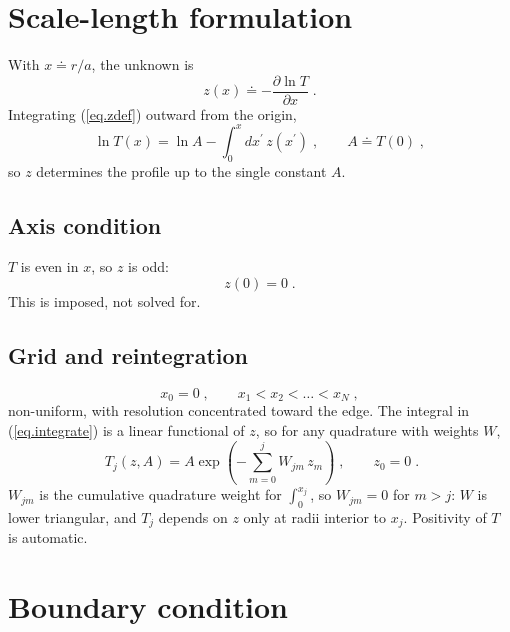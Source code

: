 \documentclass[12pt]{article}
\begin{document}
\section{Scale-length formulation}

With $x \doteq r/a$, the unknown is
%
\begin{equation}
z(x) \doteq - \frac{\partial \ln T}{\partial x} \; .
\label{eq.zdef}
\end{equation}
%
Integrating (\ref{eq.zdef}) outward from the origin,
%
\begin{equation}
\ln T(x) = \ln A - \int_0^{x} dx^\prime \, z(x^\prime) \; ,
\qquad
A \doteq T(0) \; ,
\label{eq.integrate}
\end{equation}
%
so $z$ determines the profile up to the single constant $A$.

\subsection{Axis condition}

$T$ is even in $x$, so $z$ is odd:
%
\begin{equation}
z(0) = 0 \; .
\label{eq.axis}
\end{equation}
%
This is imposed, not solved for.

\subsection{Grid and reintegration}

\begin{equation}
x_0 = 0 \; , \qquad x_1 < x_2 < \dots < x_N \; ,
\label{eq.grid}
\end{equation}
%
non-uniform, with resolution concentrated toward the edge.  The
integral in (\ref{eq.integrate}) is a linear functional of $z$, so for
any quadrature with weights $W$,
%
\begin{equation}
\boxed{\;
T_j(z,A) = A \exp \left( - \sum_{m=0}^{j} W_{jm} \, z_m \right) \; ,
\qquad z_0 = 0 \; . }
\label{eq.W}
\end{equation}
%
$W_{jm}$ is the cumulative quadrature weight for $\int_0^{x_j}$, so
$W_{jm} = 0$ for $m > j$: $W$ is lower triangular, and $T_j$ depends on
$z$ only at radii interior to $x_j$.  Positivity of $T$ is automatic.

\section{Boundary condition}
\label{sec.bc}
\end{document}
